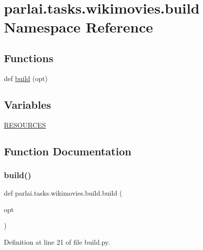 \hypertarget{namespaceparlai_1_1tasks_1_1wikimovies_1_1build}{}\section{parlai.\+tasks.\+wikimovies.\+build Namespace Reference}
\label{namespaceparlai_1_1tasks_1_1wikimovies_1_1build}
\subsection*{Functions}
\begin{DoxyCompactItemize}
\item 
def \hyperlink{namespaceparlai_1_1tasks_1_1wikimovies_1_1build_ab6770dc56d9b37e12ea2766d235a46e7}{build} (opt)
\end{DoxyCompactItemize}
\subsection*{Variables}
\begin{DoxyCompactItemize}
\item 
\hyperlink{namespaceparlai_1_1tasks_1_1wikimovies_1_1build_a6d4a343df2cf4745e705584544ac3369}{R\+E\+S\+O\+U\+R\+C\+ES}
\end{DoxyCompactItemize}


\subsection{Function Documentation}
\mbox{\label{namespaceparlai_1_1tasks_1_1wikimovies_1_1build_ab6770dc56d9b37e12ea2766d235a46e7}} 
\subsubsection{\texorpdfstring{build()}{build()}}
{\footnotesize\ttfamily def parlai.\+tasks.\+wikimovies.\+build.\+build (\begin{DoxyParamCaption}\item[{}]{opt }\end{DoxyParamCaption})}



Definition at line 21 of file build.\+py.


